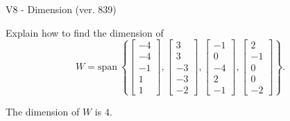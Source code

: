 \begin{exercise}
  \begin{exerciseTitle}V8 - Dimension (ver. 839)\end{exerciseTitle}
  \begin{exerciseStatement}
    Explain how to find the dimension of 
\[W=\mathrm{span}\ \left\{\left[\begin{array}{r}
-4 \\
-4 \\
-1 \\
1 \\
1
\end{array}\right] , \left[\begin{array}{r}
3 \\
3 \\
-3 \\
-3 \\
-2
\end{array}\right] , \left[\begin{array}{r}
-1 \\
0 \\
-4 \\
2 \\
-1
\end{array}\right] , \left[\begin{array}{r}
2 \\
-1 \\
0 \\
0 \\
-2
\end{array}\right]\right\}.\]



  \end{exerciseStatement}
  \begin{exerciseAnswer}
   The dimension of \(W\) is  \(4\).
  


  \end{exerciseAnswer}
\end{exercise}